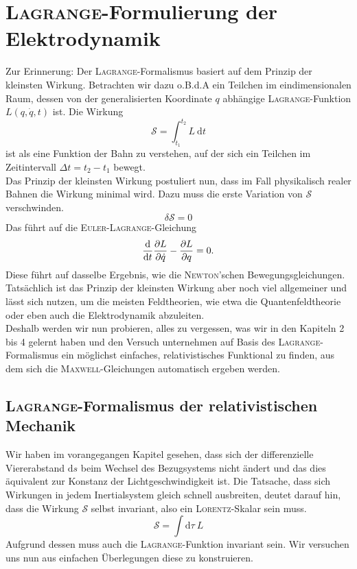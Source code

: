 \chapter[\textsc{Lagrange}-Formulierung]{\textsc{Lagrange}-Formulierung der Elektrodynamik}

Zur Erinnerung: Der \textsc{Lagrange}-Formalismus basiert auf dem Prinzip der kleinsten Wirkung. Betrachten wir dazu o.B.d.A ein Teilchen im eindimensionalen Raum, dessen von der generalisierten Koordinate $q$ abhängige \textsc{Lagrange}-Funktion $L(q,\dot{q},t)$ ist. Die Wirkung
\begin{equation*}
\mathcal{S} = \int_{t_1}^{t_2}L\ \mathrm{d}t
\end{equation*}
ist als eine Funktion der Bahn zu verstehen, auf der sich ein Teilchen im Zeitintervall $\Delta t = t_2-t_1$ bewegt. \\
Das Prinzip der kleinsten Wirkung postuliert nun, dass im Fall physikalisch realer Bahnen die Wirkung minimal wird. Dazu muss die erste Variation von $\mathcal{S}$ verschwinden.
\begin{equation*}
\delta\mathcal{S} = 0
\end{equation*}
Das führt auf die \textsc{Euler-Lagrange}-Gleichung
\begin{equation*}
\frac{\mathrm{d}{}}{\mathrm{d}{t}}\frac{\partial L}{\partial \dot{q}} - \frac{\partial L}{\partial q} = 0.
\end{equation*}
Diese führt auf dasselbe Ergebnis, wie die \textsc{Newton}'schen Bewegungsgleichungen. Tatsächlich ist das Prinzip der kleinsten Wirkung aber noch viel allgemeiner und lässt sich nutzen, um die meisten Feldtheorien, wie etwa die Quantenfeldtheorie oder eben auch die Elektrodynamik abzuleiten. \\
Deshalb werden wir nun probieren, alles zu vergessen, was wir in den  Kapiteln 2 bis 4 gelernt haben und den Versuch unternehmen auf Basis des \textsc{Lagrange}-Formalismus ein möglichst einfaches, relativistisches Funktional zu finden, aus dem sich die \textsc{Maxwell}-Gleichungen automatisch ergeben werden.

\section[\textsc{Lagrange}:relativistische Mechanik]{\textsc{Lagrange}-Formalismus der relativistischen Mechanik}

Wir haben im vorangegangen Kapitel gesehen, dass sich der differenzielle Viererabstand $\mathrm{d}s$ beim Wechsel des Bezugsystems nicht ändert und das dies äquivalent zur Konstanz der Lichtgeschwindigkeit ist. Die Tatsache, dass sich Wirkungen in jedem Inertialsystem gleich schnell ausbreiten, deutet darauf hin, dass die Wirkung $\mathcal{S}$ selbst invariant, also ein \textsc{Lorentz}-Skalar sein muss.
\begin{equation*}
\mathcal{S}=\int\mathrm{d}\tau\ L
\end{equation*}
Aufgrund dessen muss auch die \textsc{Lagrange}-Funktion invariant sein. Wir versuchen uns nun aus einfachen Überlegungen diese zu konstruieren.

